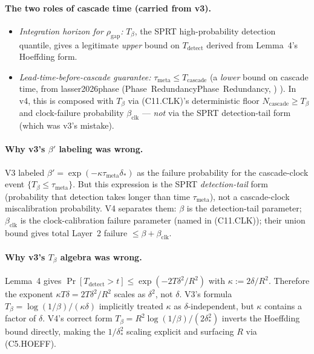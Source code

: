 \documentclass{article}
\makeatletter
\newcommand{\citep}[2][]{%
  \begingroup
  \def\@tmpkey{#2}%
  \ifx\@tmpkey\@empty\else
    (\ifx\@empty#1\@empty\else #1, \fi
     \@nameuse{bibkey@\@tmpkey})%
  \fi
  \endgroup
}
\newcommand{\deltastar}{\delta_{*}}
\newcommand{\rhogap}{\rho_{\mathrm{gap}}}
\newcommand{\Tbeta}{T_{\beta}}
\newcommand{\Ncasc}{N_{\mathrm{cascade}}}
\newcommand{\bclk}{\beta_{\mathrm{clk}}}
\makeatother
\begin{document}
\paragraph{The two roles of cascade time (carried from v3).}
\begin{itemize}
\item \emph{Integration horizon for $\rhogap$:} $\Tbeta$, the SPRT
  high-probability detection quantile, gives a legitimate
  \emph{upper} bound on $T_{\mathrm{detect}}$ derived from
  Lemma~4's Hoeffding form.
\item \emph{Lead-time-before-cascade guarantee:}
  $\tau_{\mathrm{meta}} \leq T_{\mathrm{cascade}}$ (a \emph{lower}
  bound on cascade time, from
  \citep[Phase~Redundancy]{lasser2026phase}).  In v4, this is
  composed with $\Tbeta$ via (C11.CLK)'s deterministic floor
  $\Ncasc \geq \Tbeta$ and clock-failure probability $\bclk$ —
  \emph{not} via the SPRT detection-tail form (which was v3's
  mistake).
\end{itemize}

\paragraph{Why v3's $\beta'$ labeling was wrong.}
V3 labeled $\beta' = \exp(-\kappa \tau_{\mathrm{meta}} \deltastar)$
as the failure probability for the cascade-clock event $\{\Tbeta
\leq \tau_{\mathrm{meta}}\}$.  But this expression is the SPRT
\emph{detection-tail} form (probability that detection takes longer
than time $\tau_{\mathrm{meta}}$), not a cascade-clock
miscalibration probability.  V4 separates them: $\beta$ is the
detection-tail parameter; $\bclk$ is the clock-calibration failure
parameter (named in (C11.CLK)); their union bound gives total
Layer~2 failure $\leq \beta + \bclk$.

\paragraph{Why v3's $\Tbeta$ algebra was wrong.}
Lemma~4 gives $\Pr[T_{\mathrm{detect}} > t] \leq \exp(-2T\delta^2/R^2)$
with $\kappa := 2\delta/R^2$.  Therefore the exponent
$\kappa T \delta = 2T\delta^2/R^2$ scales as $\delta^2$, not $\delta$.
V3's formula $\Tbeta = \log(1/\beta)/(\kappa\delta)$ implicitly
treated $\kappa$ as $\delta$-independent, but $\kappa$ contains a
factor of $\delta$.  V4's correct form $\Tbeta = R^2 \log(1/\beta) /
(2 \deltastar^2)$ inverts the Hoeffding bound directly, making the
$1/\deltastar^2$ scaling explicit and surfacing $R$ via (C5.HOEFF).
\end{document}
